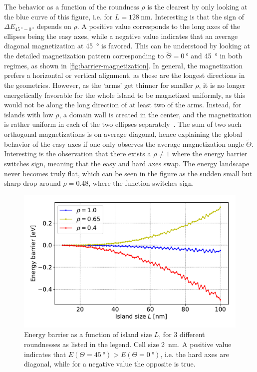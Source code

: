 \documentclass[11pt,a4paper,english,twoside]{article}
\begin{document}
The behavior as a function of the roundness $\rho$ is the clearest by only looking at the blue curve of this figure, i.e. for $L=\SI{128}{\nano\metre}$. Interesting is that the sign of $\Delta E_{\SI{45}{\degree}-\SI{0}{\degree}}$ depends on $\rho$. A positive value corresponds to the long axes of the ellipses being the easy axes, while a negative value indicates that an average diagonal magnetization at \SI{45}{\degree} is favored. This can be understood by looking at the detailed magnetization pattern corresponding to $\widetilde{\Theta} = \SI{0}{\degree}$ and \SI{45}{\degree} in both regimes, as shown in \cref{fig:barrier-magnetization}. In general, the magnetization prefers a horizontal or vertical alignment, as these are the longest directions in the geometries. However, as the `arms' get thinner for smaller $\rho$, it is no longer energetically favorable for the whole island to be magnetized uniformly, as this would not be along the long direction of at least two of the arms. Instead, for islands with low $\rho$, a domain wall is created in the center, and the magnetization is rather uniform in each of the two ellipses separately~\cite{DAS-20}. The sum of two such orthogonal magnetizations is on average diagonal, hence explaining the global behavior of the easy axes if one only observes the average magnetization angle $\widetilde{\Theta}$.
Interesting is the observation that there exists a $\rho \neq 1$ where the energy barrier switches sign, meaning that the easy and hard axes swap. The energy landscape never becomes truly flat, which can be seen in the figure as the sudden small but sharp drop around $\rho = 0.48$, where the function switches sign. \par
\begin{figure}[b!]
    \centering
    \includegraphics[width=0.8\columnwidth]{Figures/biaxial_island/Barrier/Plus_L100-10_rho1.0,0.65,0.4_cell1nm.pdf}
    \caption{Energy barrier as a function of island size $L$, for 3 different roundnesses as listed in the legend. Cell size \SI{2}{\nano\metre}. A positive value indicates that $E(\Theta=\SI{45}{\degree}) > E(\Theta=\SI{0}{\degree})$, i.e. the hard axes are diagonal, while for a negative value the opposite is true.}
    \label{fig:barrier-size}
\end{figure}
\end{document}
